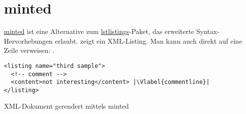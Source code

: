 
\section{minted}

\href{https://github.com/gpoore/minted}{minted} ist eine Alternative zum \href{https://ctan.org/pkg/listings}{lstlistings}-Paket, das erweiterte Syntax-Hervorhebungen erlaubt.
 zeigt ein XML-Listing.
Man kann auch direkt auf eine Zeile verweisen: .

\begin{Listing}[hb]
  \begin{verbatim}
<listing name="third sample">
  <!-- comment -->
  <content>not interesting</content> |\Vlabel{commentline}|
</listing>
\end{verbatim}
  \caption{XML-Dokument gerendert mittels minted}
  \label{lst:xml}
\end{Listing}
